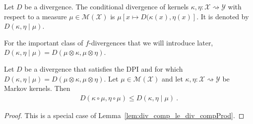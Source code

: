\begin{definition}
  \label{def:condDiv}
  Let $D$ be a divergence.
  The conditional divergence of kernels $\kappa, \eta : \mathcal X \rightsquigarrow \mathcal Y$ with respect to a measure $\mu \in \mathcal M(\mathcal X)$ is
  $\mu[x \mapsto D(\kappa(x), \eta(x)]$.
  It is denoted by $D(\kappa, \eta \mid \mu)$.
\end{definition}

For the important class of $f$-divergences that we will introduce later, $D(\kappa, \eta \mid \mu) = D(\mu \otimes \kappa, \mu \otimes \eta)$.

\begin{lemma}
  \label{lem:div_comp_le_div_compProd_right}
  Let $D$ be a divergence that satisfies the DPI and for which $D(\kappa, \eta \mid \mu) = D(\mu \otimes \kappa, \mu \otimes \eta)$.
  Let $\mathcal \mu \in \mathcal M(\mathcal X)$ and let $\kappa, \eta : \mathcal X \rightsquigarrow \mathcal Y$ be Markov kernels. Then
  \begin{align*}
  D(\kappa \circ \mu, \eta \circ \mu) \le D(\kappa, \eta \mid \mu) \: .
  \end{align*}
\end{lemma}

\begin{proof}%
{}
This is a special case of Lemma~\ref{lem:div_comp_le_div_compProd}.
\end{proof}